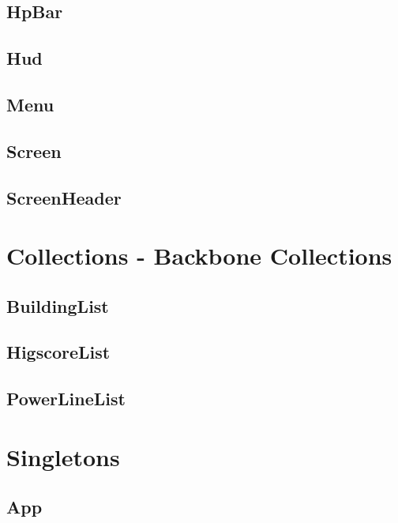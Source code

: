 	

	\subsection*{HpBar}

	\subsection*{Hud}

	\subsection*{Menu}

	\subsection*{Screen}

	\subsection*{ScreenHeader}

	\clearpage

\section{Collections - Backbone Collections}
	
	\subsection*{BuildingList}

	\subsection*{HigscoreList}

	\subsection*{PowerLineList}

	\clearpage

\section{Singletons}

	\subsection*{App}

